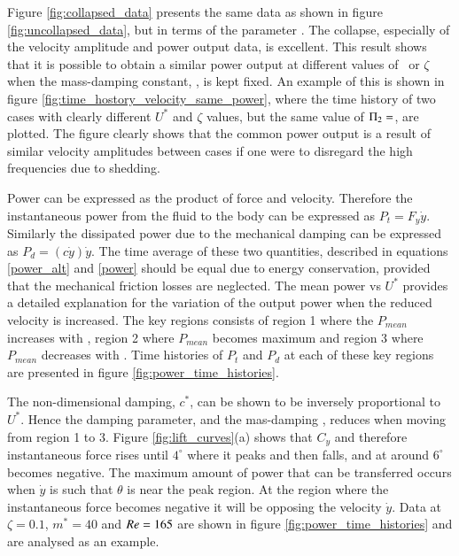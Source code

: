 Figure \ref{fig:collapsed_data} presents the same data as shown in figure \ref{fig:uncollapsed_data}, but in terms of the parameter \massdamp. The collapse, especially of the velocity amplitude and power output data, is excellent. This result shows that it is possible to obtain a similar power output at different values of \ustar\ or $\zeta$ when the mass-damping constant, \massdamp, is kept fixed. An example of this is shown in figure \ref{fig:time_hostory_velocity_same_power}, where the time history of two cases with clearly different $U^*$ and $\zeta$ values, but the same value of $\Pi_2=$, are plotted. The figure clearly shows that the common power output is a result of similar velocity amplitudes between cases if one were to disregard the high frequencies due to shedding. 


 


Power can be expressed as the product of force and velocity. Therefore the instantaneous power from the fluid to the body can be expressed as $P_t=F_y\dot{y}$. Similarly the dissipated power due to the mechanical damping can be expressed as $P_d=(c\dot{y})\dot{y}$. The time average of these two quantities, described in equations \ref{power_alt} and \ref{power} should be equal due to energy conservation, provided that the mechanical friction losses are neglected. The mean power vs $U^*$ provides a detailed explanation for the variation of the output power when the reduced velocity is increased. The key regions consists of region 1 where the $P_{mean}$ increases with \ustar, region 2 where $P_{mean}$ becomes maximum and region 3 where $P_{mean}$ decreases with \ustar. Time histories of $P_t $ and $P_d$ at each of these key regions are presented in figure \ref{fig:power_time_histories}.

The non-dimensional damping, $c^*$, can be shown to be inversely proportional to $U^*$. Hence the damping parameter, and the mas-damping \massdamp, reduces when moving from region 1 to 3. Figure \ref{fig:lift_curves}(a) shows that $C_y$ and therefore instantaneous force rises until $4^\circ$ where it peaks and then falls, and at around $6^\circ$ becomes negative. The maximum amount of power that can be transferred occurs when $\dot{y}$ is such that $\theta$ is near the peak region. At the region where the instantaneous force becomes negative it will be opposing the velocity $\dot{y}$. Data at $\zeta=0.1$, $m^*=40$ and $Re=165$ are shown in figure \ref{fig:power_time_histories} and are analysed as an example.

